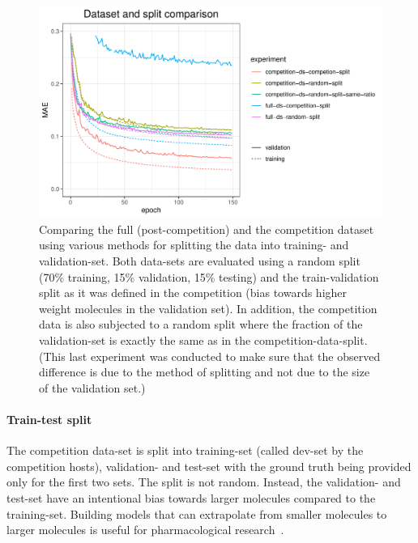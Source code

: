 \begin{figure}[H]
	\includegraphics[width=\linewidth]{figures/competition-vs-full-ds}
	\caption{Comparing the full (post-competition) and the competition dataset using various methods for splitting the data into training- and validation-set. Both data-sets are evaluated using a random split (70\% training, 15\% validation, 15\% testing) and the train-validation split as it was defined in the competition (bias towards higher weight molecules in the validation set). In addition, the competition data is also subjected to a random split where the fraction of the validation-set is exactly the same as in the competition-data-split. (This last experiment was conducted to make sure that the observed difference is due to the method of splitting and not due to the size of the validation set.)}
	\label{fig:competition-vs-full-ds}
\end{figure}

\paragraph{Train-test split}
The competition data-set is split into training-set (called dev-set by the competition hosts), validation- and test-set with the ground truth being provided only for the first two sets. The split is not random. Instead, the validation- and test-set have an intentional bias towards larger molecules compared to the training-set. Building models that can extrapolate from smaller molecules to larger molecules is useful for pharmacological research~\cite{Chen2019}.

